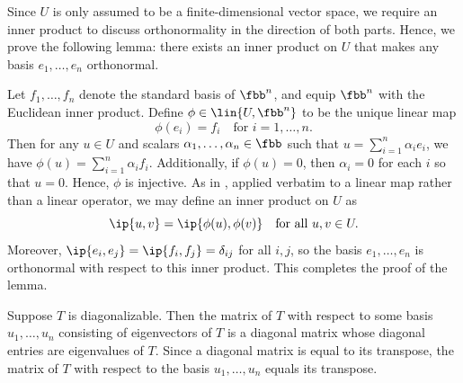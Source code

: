 \begin{sol}
    Since $U$ is only assumed to be a finite-dimensional vector space, we require an inner product to discuss orthonormality in the \leftimp direction of both parts.
    Hence, we prove the following lemma: there exists an inner product on $U$ that makes any basis $e_1, \ldots, e_n$ orthonormal.

    Let $f_1, \ldots, f_n$ denote the standard basis of $\fbb^n$, and equip $\fbb^n$ with the Euclidean inner product.
    Define $\phi \in \lin{U, \fbb^n}$ to be the unique linear map
    \[
        \phi(e_i) = f_i \quad \text{for } i = 1, \ldots, n.
    \]
    Then for any $u \in U$ and scalars $\alpha_1, \ldots, \alpha_n \in \fbb$ such that $u = \sum_{i=1}^n \alpha_i e_i$, we have $\phi(u) = \sum_{i=1}^n \alpha_i f_i$.
    Additionally, if $\phi(u) = 0$, then $\alpha_i = 0$ for each $i$ so that $u = 0$.
    Hence, $\phi$ is injective.
    As in , applied verbatim to a linear map rather than a linear operator, we may define an inner product on $U$ as
    \[
        \ip{u, v} = \ip{\phi(u), \phi(v)} \quad \text{for all } u, v \in U.
    \]
    Moreover, $\ip{e_i, e_j} = \ip{f_i, f_j} = \delta_{ij}$ for all $i, j$, so the basis $e_1, \ldots, e_n$ is orthonormal with respect to this inner product.
    This completes the proof of the lemma.
    \begin{subexercises}
        \item \rightimp Suppose $T$ is diagonalizable.
        Then the matrix of $T$ with respect to some basis $u_1, \ldots, u_n$ consisting of eigenvectors of $T$ is a diagonal matrix whose diagonal entries are eigenvalues of $T$.
        Since a diagonal matrix is equal to its transpose, the matrix of $T$ with respect to the basis $u_1, \ldots, u_n$ equals its transpose.


\end{subexercises}
\end{sol}

